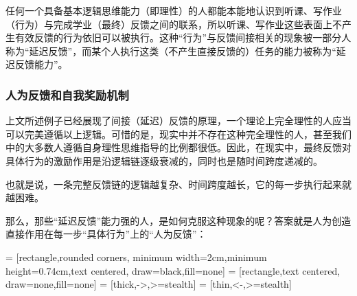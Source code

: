             任何一个具备基本逻辑思维能力（即理性）的人都能本能地认识到听课、写作业（行为）与完成学业（最终）反馈之间的联系，所以听课、写作业这些表面上不产生有效反馈的行为依旧可以被执行。这种“行为”与反馈间接相关的现象被一部分人称为“延迟反馈”，而某个人执行这类（不产生直接反馈的）任务的能力被称为“延迟反馈能力”。

        \subsubsection*{人为反馈和自我奖励机制}
            上文所述例子已经展现了间接（延迟）反馈的原理，一个理论上完全理性的人应当可以完美遵循以上逻辑。可惜的是，现实中并不存在这种完全理性的人，甚至我们中的大多数人遵循自身理性思维指导的比例都很低。因此，在现实中，最终反馈对具体行为的激励作用是沿逻辑链逐级衰减的，同时也是随时间跨度递减的。
            
            也就是说，一条完整反馈链的逻辑越复杂、时间跨度越长，它的每一步执行起来就越困难。

            \pagebreak

            那么，那些“延迟反馈”能力强的人，是如何克服这种现象的呢？答案就是人为创造直接作用在每一步“具体行为”上的“人为反馈”：
            
            \begin{center}
                 = [rectangle,rounded corners, minimum width=2cm,minimum height=0.74cm,text centered, draw=black,fill=none]
                 = [rectangle,text centered, draw=none,fill=none]
                 = [thick,->,>=stealth]
                  = [thin,<-,>=stealth]
            \end{center}

